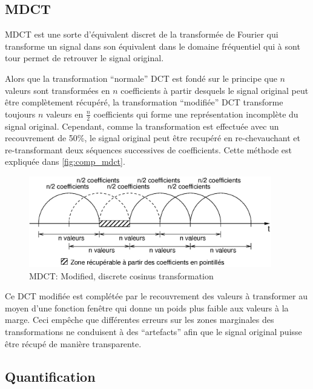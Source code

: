 \documentclass[a4paper,12pt,BCOR6mm,bibtotoc,idxtotoc]{scrbook}
\begin{document}
\subsection{MDCT}

MDCT est une sorte d'\'equivalent discret de la transform\'ee
de Fourier qui transforme un signal dans son \'equivalent dans le domaine
fr\'equentiel qui \`a sont tour permet de retrouver le signal original.

Alors que la transformation ``normale'' DCT est fond\'e sur le
principe que $n$ valeurs sont transform\'ees en $n$ coefficients \`a
partir desquels le signal original peut \^etre compl\`etement
r\'ecup\'er\'e, la transformation ``modifi\'ee'' DCT transforme
toujours $n$ valeurs en $\frac{n}{2}$ coefficients qui forme une
repr\'esentation incompl\`ete du signal original.  Cependant, comme la
transformation est effectu\'ee avec un recouvrement de 50\%, le signal
original peut \^etre recup\'er\'e en re-chevauchant et re-transformant
deux s\'equences successives de coefficients.  Cette m\'ethode est
expliqu\'ee dans \autoref{fig:comp_mdct}.

\begin{figure}[htb]
  \begin{center}
    \includegraphics[width=300pt]{bilder/mdct_fr}
  \end{center} \caption{MDCT: Modified, discrete cosinus transformation}
  \label{fig:comp_mdct}
\end{figure}


Ce DCT modifi\'ee est compl\'et\'ee par le recouvrement des valeurs
\`a transformer au moyen d'une fonction fen\^etre qui donne un poids
plus faible aux valeurs \`a la marge.  Ceci emp\^eche que
diff\'erentes erreurs sur les zones marginales des transformations ne
conduisent \`a des ``artefacts'' afin que le signal original puisse
\^etre r\'ecup\'e de mani\`ere transparente.


\subsection{Quantification}
\end{document}
